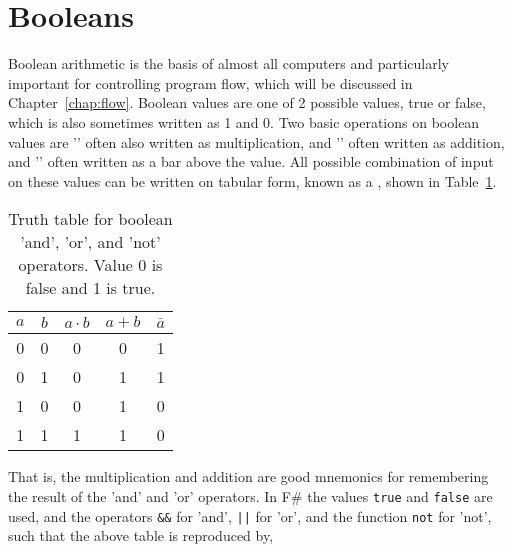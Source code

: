 \section{Booleans}
Boolean arithmetic is the basis of almost all computers and particularly important for controlling program flow, which will be discussed in Chapter~\ref{chap:flow}. Boolean values are one of 2 possible values, true or false, which is also sometimes written as 1 and 0. Two basic operations on boolean values are '' often also written as multiplication, and '' often written as addition, and '' often written as a bar above the value. All possible combination of input on these values can be written on tabular form, known as a , shown in Table~\ref{tab:truthTable}.
\begin{table}
  \centering
  \begin{tabular}{|c|c|c|c|c|}
    \hline
    $a$ & $b$ & $a\cdot b$& $a + b$&$\bar{a}$\\
    \hline
    0&0&0&0&1\\
    0&1&0&1&1\\
    1&0&0&1&0\\
    1&1&1&1&0\\
    \hline
  \end{tabular}
  \caption{Truth table for boolean 'and', 'or', and 'not' operators. Value 0 is false and 1 is true.}
  \label{tab:truthTable}
\end{table}
That is, the multiplication and addition are good mnemonics for remembering the result of the 'and' and 'or' operators. In F\# the values \lstinline|true| and \lstinline|false| are used, and the operators \lstinline|&&| for 'and', \lstinline+||+ for 'or', and the function \lstinline|not| for 'not', such that the above table is reproduced by,
%

